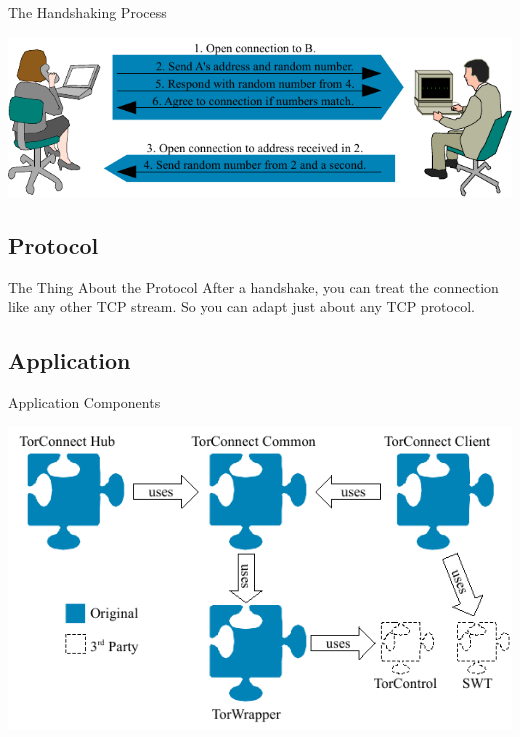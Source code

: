 \documentclass{beamer}
\begin{document}
\begin{frame}{The Handshaking Process}
\begin{center}
\includegraphics[width=.9\textwidth]{handshake.pdf}
\end{center}
\end{frame}

\subsection{Protocol}
\begin{frame}{The Thing About the Protocol}
After a handshake, you can treat the connection like any other TCP stream.  So you can adapt just about any TCP protocol.
\end{frame}

\subsection{Application}
\begin{frame}{Application Components}
\begin{center}
\includegraphics[width=.9\textwidth]{architecture.pdf}
\end{center}
\end{frame}
\end{document}
